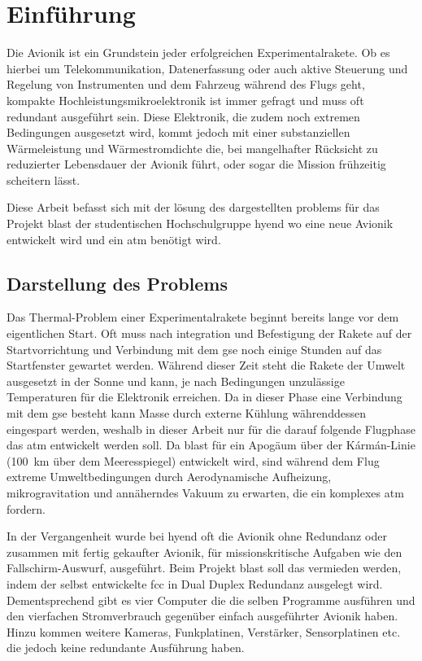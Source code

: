 \chapter{Einführung}			
\label{sec:Introduction}


Die Avionik ist ein Grundstein jeder erfolgreichen Experimentalrakete. Ob es hierbei um Telekommunikation,
Datenerfassung oder auch aktive Steuerung und Regelung von
Instrumenten und dem Fahrzeug während des Flugs geht, kompakte Hochleistungsmikroelektronik ist immer gefragt und muss oft redundant ausgeführt sein.
Diese Elektronik, die zudem noch extremen Bedingungen ausgesetzt wird, kommt jedoch mit einer
substanziellen Wärmeleistung und Wärmestromdichte die, bei mangelhafter Rücksicht zu reduzierter Lebensdauer der Avionik führt,
oder sogar die Mission frühzeitig scheitern lässt.

Diese Arbeit befasst sich mit der lösung des dargestellten problems für das Projekt \ac{blast} der studentischen Hochschulgruppe \ac{hyend}
wo eine neue Avionik entwickelt wird und ein \ac{atm} benötigt wird.

\section{Darstellung des Problems}

Das Thermal-Problem einer Experimentalrakete beginnt bereits lange vor dem eigentlichen Start. Oft muss nach integration und
Befestigung der Rakete auf der Startvorrichtung und Verbindung mit dem \ac{gse} noch einige Stunden auf das Startfenster gewartet werden.
Während dieser Zeit steht die Rakete der Umwelt ausgesetzt in der Sonne und kann, je nach Bedingungen 
unzulässige Temperaturen für die Elektronik erreichen. Da in dieser Phase eine Verbindung mit dem 
\ac{gse} besteht kann Masse durch externe Kühlung währenddessen eingespart werden, weshalb in dieser Arbeit nur für die darauf folgende 
Flugphase das \ac{atm} entwickelt werden soll.
Da \ac{blast} für ein Apogäum über der Kármán-Linie (\SI{100}{\kilo\meter} über dem Meeresspiegel) entwickelt wird, sind während dem Flug extreme Umweltbedingungen
durch Aerodynamische Aufheizung, mikrogravitation und annäherndes Vakuum zu erwarten, die ein komplexes \ac{atm} fordern.

In der Vergangenheit wurde bei \ac{hyend} oft die Avionik ohne Redundanz oder zusammen mit fertig gekaufter Avionik, für 
missionskritische Aufgaben wie den Fallschirm-Auswurf, ausgeführt. Beim Projekt \ac{blast} soll das vermieden werden, 
indem der selbst entwickelte \ac{fcc} in Dual Duplex Redundanz ausgelegt wird. Dementsprechend gibt es vier Computer die
die selben Programme ausführen und den vierfachen Stromverbrauch gegenüber einfach ausgeführter Avionik haben. Hinzu kommen
weitere Kameras, Funkplatinen, Verstärker, Sensorplatinen etc. die jedoch keine redundante Ausführung haben.

